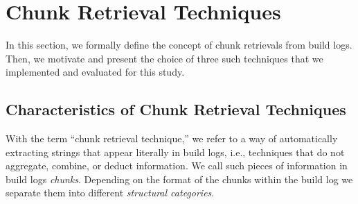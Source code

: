 
\section{Chunk Retrieval Techniques}
\label{sec:techniques}

In this section, we formally define the concept of chunk
retrievals from build logs.
Then, we motivate and present the choice of three such techniques that
we implemented and evaluated for this study.



\subsection{Characteristics of Chunk Retrieval Techniques}
\label{sec:crt-characteristics}

With the term ``chunk retrieval technique,'' we refer to a way of
automatically extracting strings that appear literally in build
logs, i.e., techniques that do not aggregate, combine, or deduct
information.
We call such pieces of information in build logs
\emph{chunks}.
Depending on the format of the chunks within the build log we
separate them into different \emph{structural categories}.

